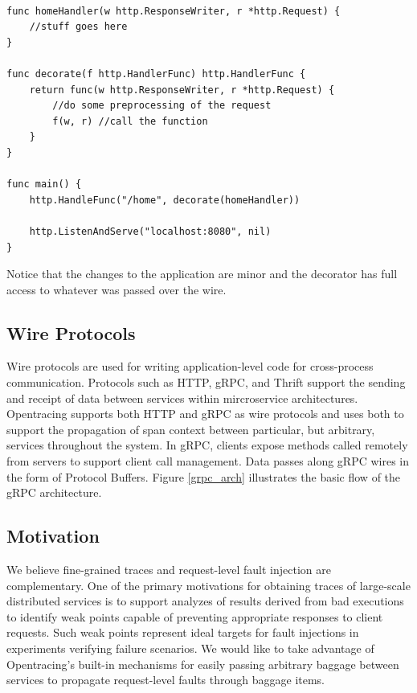 \begin{lstlisting}[basicstyle=\tiny, ] %or \small or \footnotesize etc.

func homeHandler(w http.ResponseWriter, r *http.Request) {
    //stuff goes here
}

func decorate(f http.HandlerFunc) http.HandlerFunc {
    return func(w http.ResponseWriter, r *http.Request) {
        //do some preprocessing of the request
        f(w, r) //call the function
    }
}

func main() {
    http.HandleFunc("/home", decorate(homeHandler))

    http.ListenAndServe("localhost:8080", nil)
}
\end{lstlisting}

Notice that the changes to the application are minor and the decorator has full access to whatever was passed over the wire.


\subsection{Wire Protocols}
Wire protocols are used for writing application-level code for cross-process communication. 
Protocols such as HTTP, gRPC\cite{google:grpc}, and Thrift\cite{apache:thrift} support the sending and receipt of data between services within mircroservice architectures. Opentracing supports both HTTP and gRPC as wire protocols and uses both to support the propagation of span context between particular, but arbitrary, services throughout the system. In gRPC, clients expose methods called remotely from servers to support client call management. Data passes along gRPC wires in the 
form of Protocol Buffers\cite{google:protobuf}. Figure \ref{grpc_arch} illustrates the basic flow of the gRPC architecture\cite{google:grpc}.


\subsection{Motivation}
We believe fine-grained traces and request-level fault injection are complementary.
One of the primary motivations for obtaining traces of large-scale distributed services is to support analyzes of results derived from 
bad executions to identify weak points capable of preventing appropriate responses to client requests. Such  weak points 
represent ideal targets for fault injections in experiments verifying failure scenarios.
We would like to take advantage of Opentracing's built-in mechanisms for easily passing arbitrary baggage between services to propagate request-level faults through baggage items. 




